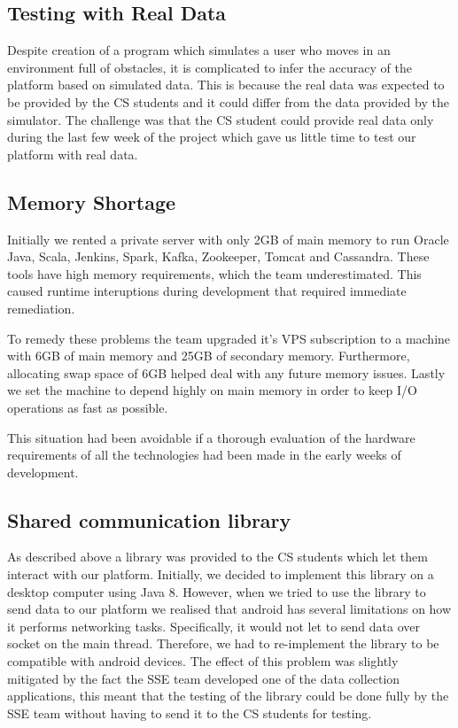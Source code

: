 \documentclass[prodmode,acmtosem]{acmsmall} %
\begin{document}
\subsection{Testing with Real Data}
Despite creation of a program which simulates a user who moves in an environment full of obstacles, it is complicated to infer the accuracy of the platform based on simulated data. This is because the real data was expected to be provided by the CS students and it could differ from the data provided by the simulator. The challenge was that the CS student could provide real data only during the last few week of the project which gave us little time to test our platform with real data. 

\subsection{Memory Shortage}
Initially we rented a private server with only 2GB of main memory to run Oracle Java, Scala, Jenkins, Spark, Kafka, Zookeeper, Tomcat and Cassandra. These tools have high memory requirements, which the team underestimated. This caused runtime interuptions during development that required immediate remediation. 

To remedy these problems the team upgraded it's VPS subscription to a machine with 6GB of main memory and 25GB of secondary memory. Furthermore, allocating swap space of 6GB helped deal with any future memory issues. Lastly we set the machine to depend highly on main memory in order to keep I/O operations as fast as possible.

This situation had been avoidable if a thorough evaluation of the hardware requirements of all the technologies had been made in the early weeks of development.

\subsection{Shared communication library}
As described above a library was provided to the CS students which let them interact with our platform. Initially, we decided to implement this library on a desktop computer using Java 8. However, when we tried to use the library to send data to our platform we realised that android has several limitations on how it performs networking tasks. Specifically, it would not let to send data over socket on the main thread. Therefore, we had to re-implement the library to be compatible with android devices. The effect of this problem was slightly mitigated by the fact the SSE team developed one of the data collection applications, this meant that the testing of the library could be done fully by the SSE team without having to send it to the CS students for testing.
\end{document}
